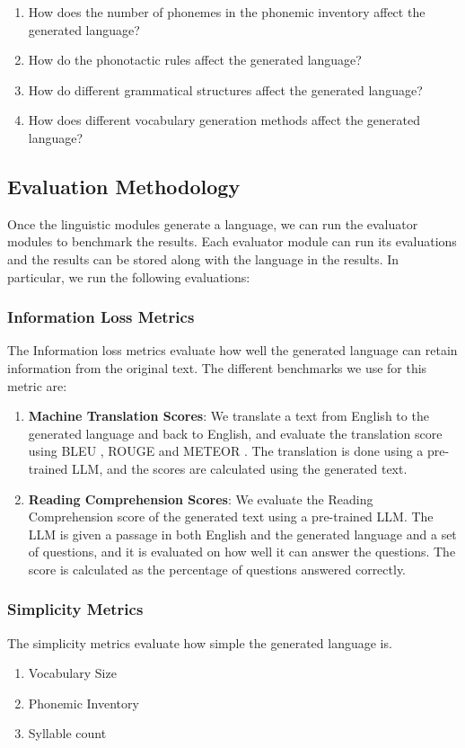 \begin{enumerate}
	\item How does the number of phonemes in the phonemic inventory affect the generated language?
	\item How do the phonotactic rules affect the generated language?
	\item How do different grammatical structures affect the generated language?
	\item How does different vocabulary generation methods affect the generated language?
\end{enumerate}


\subsection{Evaluation Methodology}
Once the linguistic modules generate a language, we can run the evaluator modules to benchmark the results. Each evaluator module can run its evaluations
and the results can be stored along with the language in the results. In particular, we run the following evaluations:

\subsubsection{Information Loss Metrics}
The Information loss metrics evaluate how well the generated language can retain information from the original text. The different benchmarks we use for this metric are:

\begin{enumerate}
	\item \textbf{Machine Translation Scores}: We translate a text from English to the generated language and back to English, and evaluate the translation score using BLEU \cite{papineniBLEUMethodAutomatic2002}, ROUGE \cite{linROUGEPackageAutomatic2004} and METEOR \cite{banerjeeMETEORAutomaticMetric2005}. 
	The translation is done using a pre-trained LLM, and the scores are calculated using the generated text.
	\item \textbf{Reading Comprehension Scores}: We evaluate the Reading Comprehension score of the generated text using a pre-trained LLM. 
	The LLM is given a passage in both English and the generated language and a set of questions, and it is evaluated on how well it can answer the questions. 
	The score is calculated as the percentage of questions answered correctly.
\end{enumerate}

\subsubsection{Simplicity Metrics}
The simplicity metrics evaluate how simple the generated language is.

\begin{enumerate}
	\item Vocabulary Size
	\item Phonemic Inventory
	\item Syllable count
\end{enumerate}



